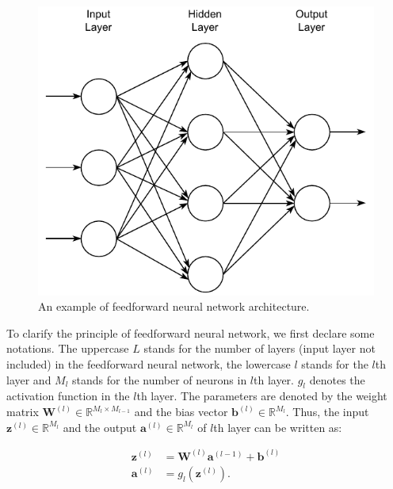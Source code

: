 \documentclass[
	parskip, 			   %
	twoside, 			   %
	DIV=14, 			   %
	BCOR=15.0mm, 		   %
	headsepline, 		   %
	open=right, 		   %
	captions=tableheading, %
	bibliography=totoc,    %
	numbers=noenddot       %
]{scrreprt}
\begin{document}
\clearpage
\begin{figure}[h!]
    \centering
    \includegraphics[scale=1]{figures/feedforward_neural_network.pdf}
    \caption{An example of feedforward neural network architecture.}
    \label{fig:feedforward}
\end{figure}

To clarify the principle of feedforward neural network, we first declare some notations. The uppercase $L$ stands for the number of layers (input layer not included) in the feedforward neural network, the lowercase $l$ stands for the $l$th layer and $M_{l}$ stands for the number of neurons in $l$th layer. $g_{l}$ denotes the activation function in the $l$th layer. The parameters are denoted by the weight matrix $\mathbf{W}^{(l)} \in \mathbb{R}^{M_{l} \times M_{l-1}}$ and the bias vector $\mathbf{b}^{(l)} \in \mathbb{R}^{M_{l}}$. Thus, the input $\mathbf{z}^{(l)} \in \mathbb{R}^{M_{l}}$ and the output $\mathbf{a}^{(l)} \in \mathbb{R}^{M_{l}}$ of $l$th layer can be written as:

\begin{equation}
    \label{eq:input_output_neuron}
    \begin{aligned}
    \mathbf{z}^{(l)} &= \mathbf{W}^{(l)} \mathbf{a}^{(l-1)} + \mathbf{b}^{(l)}\\
    \mathbf{a}^{(l)} &= g_{l}(\mathbf{z}^{(l)}).
    \end{aligned}
\end{equation}
\end{document}
